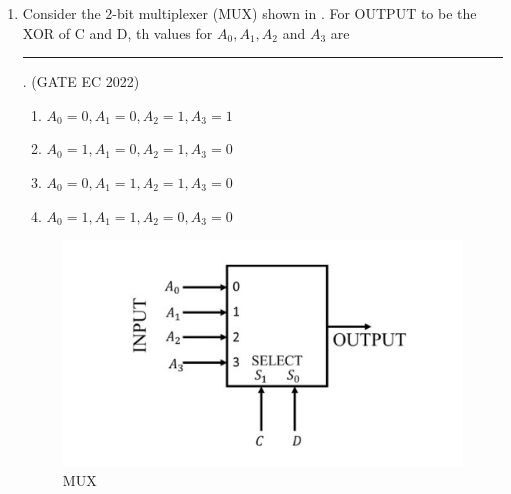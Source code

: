 \begin{enumerate}[label=\arabic*.,ref=\theenumi]
\item
	 Consider the $2$-bit multiplexer (MUX) shown in  
		 .
	  For OUTPUT to be the XOR of C and D, th values for $A_0,A_1,A_2$ and $A_3$  are  \rule{1cm}{0.1pt}. \hfill(GATE EC 2022)
	 \begin{enumerate}
		\item $A_0=0,A_1=0,A_2=1,A_3=1$
		\item $A_0=1,A_1=0,A_2=1,A_3=0$
		\item $A_0=0,A_1=1,A_2=1,A_3=0$
		\item $A_0=1,A_1=1,A_2=0,A_3=0$
	\end{enumerate}
	 \begin{figure}[H]
		 \centering
		\includegraphics[width=0.5\columnwidth]{figs/gatepic19.jpg}
		\caption{MUX}
		 \label{fig:MUX}
	\end{figure}

\end{enumerate}




